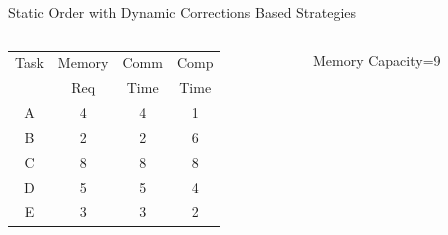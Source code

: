 \documentclass[mathserif,hyperref={pdfpagemode=FullScreen}]{beamer}
\newcommand{\schedule}[3]{
	\draw[->] (-0.2, 0) -- (#1, 0) node[below] {$t$};
	\draw (0, 0) -- (0, 1.5);
	\node at (-0.8, 0.75)[rotate=90] {#2};
	\draw[dashed,gray] (0, 0.75) -- (#1, 0.75);
	\foreach \t in {0,#3} {
		\node[xtick=\t] at (\t, 0){};
	}
}
\newcommand{\task}[6][0]{
	\node[comm=#2 start #3 length #4 color #6]{};
	\node[comp=#2 start #3+#4+#1 length #5 color #6]{}; 
}
\begin{document}
\begin{frame}{Static Order with Dynamic Corrections Based Strategies}
\begin{columns}
	\footnotesize
	\begin{column}[c]{0.4\linewidth}
		\begin{tabular}{|c|c|c|c|}
			\hline
	Task & Memory & Comm & Comp\\
& Req & Time & Time\\ \hline 
			A & 4 & 4 &  1\\ \hline
			B & 2 & 2 & 6\\ \hline
			C & 8 & 8 & 8\\ \hline
			D & 5 & 5 & 4\\ \hline
			E & 3 & 3 & 2\\ \hline
		\end{tabular}
	\end{column}
	\begin{column}[c]{0.6\linewidth}
		\begin{block}{Memory Capacity=9}
\newcommand{\taskA}[2][0]{\task[####1]{$A$}{####2}{4}{1}{cyan}}
\newcommand{\taskB}[2][0]{\task[####1]{$B$}{####2}{2}{6}{cyan!50!black}}
\newcommand{\taskC}[2][0]{\task[####1]{$C$}{####2}{8}{8}{blue!40!white}}
\newcommand{\taskD}[2][0]{\task[####1]{$D$}{####2}{5}{4}{blue!70!white}}
\newcommand{\taskE}[2][0]{\task[####1]{$E$}{####2}{3}{2}{blue}}
		\end{block}
	\end{column}	
\end{columns}
\end{frame}
\end{document}
